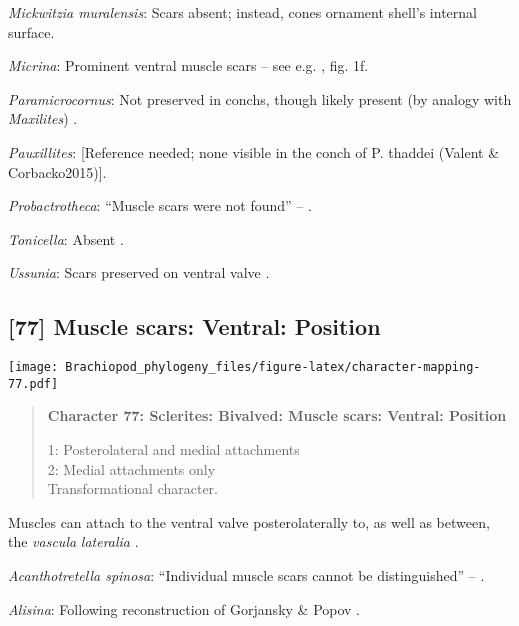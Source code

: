 \documentclass[openany]{book}
\theoremstyle{definition}
\theoremstyle{definition}
\theoremstyle{definition}
\theoremstyle{remark}
\begin{document}
\hypertarget{Mickwitzia_muralensis-coding-76}{}
\emph{Mickwitzia muralensis}: Scars absent; instead, cones ornament
shell's internal surface.

\hypertarget{Micrina-coding-76}{}
\emph{Micrina}: Prominent ventral muscle scars -- see e.g.
\citet{Holmer2008TheEarly}, fig. 1f.

\hypertarget{Paramicrocornus-coding-76}{}
\emph{Paramicrocornus}: Not preserved in conchs, though likely present
(by analogy with \emph{Maxilites}) \citep{Zhang2018Ahyolithid}.

\hypertarget{Pauxillites-coding-76}{}
\emph{Pauxillites}: {[}Reference needed; none visible in the conch of P.
thaddei (Valent \& Corbacko2015){]}.

\hypertarget{Probactrotheca-coding-76}{}
\emph{Probactrotheca}: ``Muscle scars were not found'' --
\citet{Valent2012}.

\hypertarget{Tonicella-coding-76}{}
\emph{Tonicella}: Absent \citep{Schwabe2010}.

\hypertarget{Ussunia-coding-76}{}
\emph{Ussunia}: Scars preserved on ventral valve \citep{Nikitin1984}.

\subsection*{{[}77{]} Muscle scars: Ventral:
Position}\label{muscle-scars-ventral-position}

\texttt{[image: Brachiopod\_phylogeny\_files/figure-latex/character-mapping-77.pdf]}

\begin{quote}
\textbf{Character 77: Sclerites: Bivalved: Muscle scars: Ventral:
Position}

1: Posterolateral and medial attachments\\
2: Medial attachments only\\
Transformational character.
\end{quote}

Muscles can attach to the ventral valve posterolaterally to, as well as
between, the \emph{vascula} \emph{lateralia}
\citep{Popov1992TheCambrian}.

\hypertarget{Acanthotretella_spinosa-coding-77}{}
\emph{Acanthotretella spinosa}: ``Individual muscle scars cannot be
distinguished'' -- \citet{Holmer2006Aspinose}.

\hypertarget{Alisina-coding-77}{}
\emph{Alisina}: Following reconstruction of Gorjansky \& Popov
\citeyearpar{Gorjansky1986Onthe}.
\end{document}

